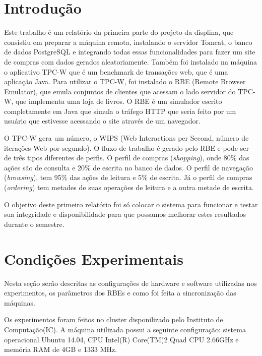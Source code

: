\documentclass[11pt,twoside]{article}
\begin{document}
\section{Introdução}
\setlength{\parindent}{4ex}
Este trabalho \'e um relat\'orio da primeira parte do projeto da displina, que consistiu em preparar a m\'aquina remota, instalando o servidor Tomcat, o banco de dados PostgreSQL e integrando todas essas funcionalidades para fazer um site de compras com dados gerados aleatoriamente. Também foi instalado na máquina o aplicativo TPC-W que \'e um benchmark de transa\c{c}\~oes web, que é uma aplica\c{c}\~ao Java. Para utilizar o TPC-W, foi instalado o RBE (Remote Browser Emulator), que emula conjuntos de clientes que acessam o lado servidor do TPC-W, que implementa uma loja de livros. O RBE \'e um simulador escrito completamente em Java que simula o tr\'afego HTTP que seria feito por um usu\'ario que estivesse acessando o site atrav\'es de um navegador.

  O TPC-W gera um n\'umero, o WIPS (Web Interactions per Second, n\'umero de itera\c{c}\~oes Web por segundo). O fluxo de trabalho é gerado pelo RBE e pode ser de tr\^es tipos diferentes de perfis. O perfil de compras (\textit{shopping}), onde 80\% das a\c{c}\~oes são de consulta e 20\% de escrita no banco de dados. O perfil de navega\c{c}\~ao (\textit{browsing}), tem 95\% das a\c{c}\~oes de leitura e 5\% de escrita. J\'a o perfil de compras (\textit{ordering}) tem metades de suas opera\c{c}\~oes de leitura e a outra metade de escrita.

  	O objetivo deste primeiro relatório foi só colocar o sistema para funcionar e testar sua integridade e disponibilidade para que possamos melhorar estes resultados durante o semestre.

\section{Condições Experimentais}
\setlength{\parindent}{4ex}

	 Nesta se\c{c}\~ao ser\~ao descritas as configura\c{c}\~oes de hardware e software utilizadas nos experimentos, os par\^ametros dos RBEs e como foi feita a sincroniza\c{c}\~ao das m\'aquinas.
	
	Os experimentos foram feitos no cluster disponilizado pelo Instituto de Computa\c{c}\~ao(IC). A m\'aquina utilizada possui a seguinte configura\c{c}\~ao: sistema operacional Ubuntu 14.04, CPU Intel(R) Core(TM)2 Quad CPU 2.66GHz e mem\'oria RAM de 4GB e 1333 MHz.
\end{document}
